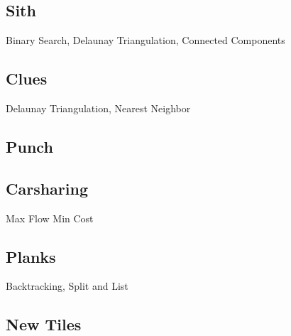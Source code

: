 \documentclass[10pt,a4paper,twoside]{report}
\begin{document}
\newpage
\subsection*{Sith}
\begin{keywords}Binary Search, Delaunay Triangulation, Connected Components\end{keywords}



\newpage
\subsection*{Clues}
\begin{keywords}Delaunay Triangulation, Nearest Neighbor\end{keywords}


\newpage
\subsection*{Punch}
\begin{keywords}\end{keywords}


\newpage
\subsection*{Carsharing}
\begin{keywords}Max Flow Min Cost\end{keywords}


\newpage
\subsection*{Planks}
\begin{keywords}Backtracking, Split and List\end{keywords}



\newpage
\subsection*{New Tiles}
\begin{keywords}\end{keywords}

\end{document}
